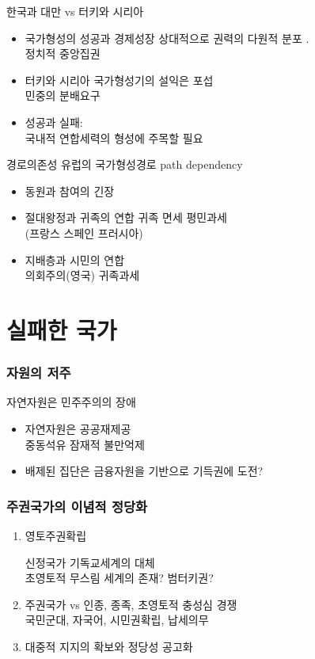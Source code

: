 \documentclass[xcolor=pdftex,dvipsnames]{beamer}
\renewcommand{\(}{\left(}
\renewcommand{\)}{\right)}
\begin{document}
\begin{frame}{한국과 대만 vs 터키와 시리아}
\begin{itemize}
\item 국가형성의 성공과 경제성장
상대적으로 권력의 다원적 분포 .\\
정치적 중앙집권 \\
\item 터키와 시리아
국가형성기의 설익은 포섭\\
민중의 분배요구\\
\item 성공과 실패: \\
국내적 연합세력의 형성에 주목할 필요
\end{itemize}
\end{frame}

\begin{frame}{경로의존성}
유럽의 국가형성경로 path dependency
\begin{itemize}
\item 동원과 참여의 긴장
\item 절대왕정과 귀족의 연합
귀족 면세 평민과세\\
(프랑스 스페인 프러시아)
\item 지배층과 시민의 연합\\
의회주의(영국) 귀족과세
\end{itemize}
\end{frame}

\section{실패한 국가}

\begin{frame}
\frametitle{자원의 저주}
자연자원은 민주주의의 장애
\begin{itemize}
\item 자연자원은 공공재제공\\
중동석유 잠재적 불만억제\\
\item 배제된 집단은 금융자원을  기반으로 기득권에 도전?
\end{itemize}
\end{frame}


\begin{frame}
\frametitle{주권국가의 이념적 정당화} 
\begin{enumerate}
\item  영토주권확립


신정국가 기독교세계의 대체\\
초영토적 무스림 세계의 존재? 범터키권?
\item  주권국가 vs 인종, 종족, 초영토적 충성심 경쟁\\
국민군대, 자국어, 시민권확립, 납세의무
\item  대중적 지지의 확보와 정당성 공고화\\
\end{enumerate}
\end{frame}
\end{document}
